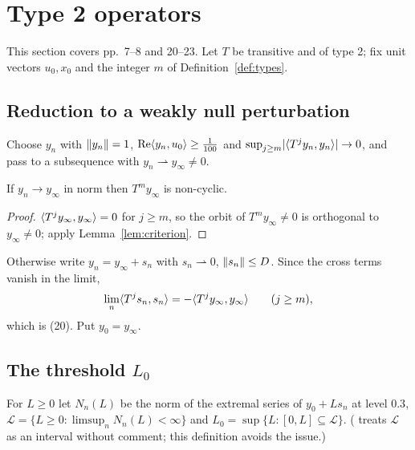\section{Type 2 operators}\label{sec:type2}

This section covers \paper{} pp.~7--8 and 20--23. Let $T$ be transitive and of type 2; fix unit
vectors $u_0,x_0$ and the integer $m$ of Definition~\ref{def:types}.

\subsection{Reduction to a weakly null perturbation}
Choose $y_n$ with $\lVert y_n\rVert=1$, $\operatorname{Re}\langle y_n,u_0\rangle\ge\frac1{100}$ and
$\sup_{j\ge m}\lvert \langle T^jy_n,y_n\rangle\rvert\to0$, and pass to a subsequence with $y_n\rightharpoonup
y_\infty\ne0$.

\begin{lemma}\label{lem:type2norm}\stproved{}
If $y_n\to y_\infty$ in norm then $T^my_\infty$ is non-cyclic.
\end{lemma}
\begin{proof}
$\langle T^jy_\infty,y_\infty\rangle=0$ for $j\ge m$, so the orbit of $T^my_\infty\ne0$ is orthogonal to
$y_\infty\ne0$; apply Lemma~\ref{lem:criterion}.
\end{proof}

Otherwise write $y_n=y_\infty+s_n$ with $s_n\rightharpoonup0$, $\lVert s_n\rVert\le D$. Since the
cross terms vanish in the limit,
\begin{equation}\label{eq:type2}
\lim_n\langle T^js_n,s_n\rangle=-\langle T^jy_\infty,y_\infty\rangle\qquad(j\ge m),
\end{equation}
which is \paper{} (20). Put $y_0=y_\infty$.

\subsection{\texorpdfstring{The threshold $L_0$}{The threshold L0}}
For $L\ge0$ let $N_n(L)$ be the norm of the extremal series of $y_0+Ls_n$ at level $0.3$,
$\mathcal L=\{L\ge0:\limsup_nN_n(L)<\infty\}$ and $L_0=\sup\{L:[0,L]\subseteq\mathcal L\}$.
(\paper{} treats $\mathcal L$ as an interval without comment; this definition avoids the issue.)

